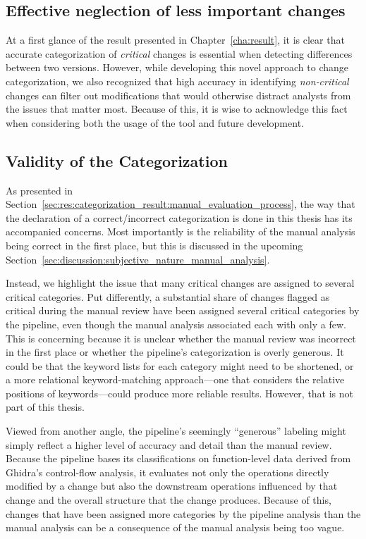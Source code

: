 \subsection{Effective neglection of less important changes}
At a first glance of the result presented in Chapter~\ref{cha:result}, it is clear that accurate categorization of \emph{critical} changes is essential when detecting differences between two versions. However, while developing this novel approach to change categorization, we also recognized that high accuracy in identifying \emph{non‑critical} changes can filter out modifications that would otherwise distract analysts from the issues that matter most. Because of this, it is wise to acknowledge this fact when considering both the usage of the tool and future development.


\subsection{Validity of the Categorization}
\label{sec:discussion:result:validity_of_categorization}
As presented in Section~\ref{sec:res:categorization_result:manual_evaluation_process}, the way that the declaration of a correct/incorrect categorization is done in this thesis has its accompanied concerns. Most importantly is the reliability of the manual analysis being correct in the first place, but this is discussed in the upcoming Section~\ref{sec:discussion:subjective_nature_manual_analysis}. 

Instead, we highlight the issue that many critical changes are assigned to several critical categories. Put differently, a substantial share of changes flagged as critical during the manual review have been assigned several critical categories by the pipeline, even though the manual analysis associated each with only a few. This is concerning because it is unclear whether the manual review was incorrect in the first place or whether the pipeline’s categorization is overly generous. It could be that the keyword lists for each category might need to be shortened, or a more relational keyword-matching approach—one that considers the relative positions of keywords—could produce more reliable results.  However, that is not part of this thesis.

Viewed from another angle, the pipeline’s seemingly “generous” labeling might simply reflect a higher level of accuracy and detail than the manual review. Because the pipeline bases its classifications on function-level data derived from Ghidra’s control-flow analysis, it evaluates not only the operations directly modified by a change but also the downstream operations influenced by that change and the overall structure that the change produces. Because of this, changes that have been assigned more categories by the pipeline analysis than the manual analysis can be a consequence of the manual analysis being too vague.



